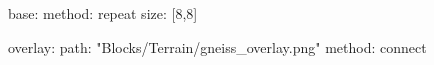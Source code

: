 base:
  method: repeat
  size: [8,8]

overlay:
  path: "Blocks/Terrain/gneiss_overlay.png"
  method: connect